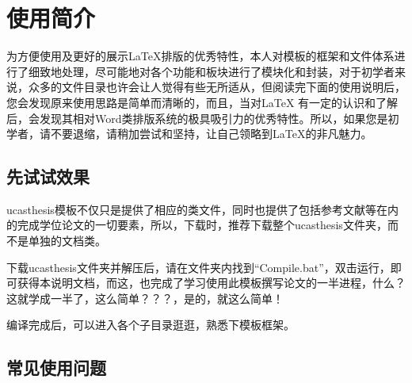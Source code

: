 
\chapter{使用简介}
\label{chap:guide}

为方便使用及更好的展示\LaTeX{}排版的优秀特性，本人对模板的框架和文件体系进行了细致地处理，尽可能地对各个功能和板块进行了模块化和封装，对于初学者来说，众多的文件目录也许会让人觉得有些无所适从，但阅读完下面的使用说明后，您会发现原来使用思路是简单而清晰的，而且，当对\LaTeX{} 有一定的认识和了解后，会发现其相对Word类排版系统的极具吸引力的优秀特性。所以，如果您是初学者，请不要退缩，请稍加尝试和坚持，让自己领略到\LaTeX{}的非凡魅力。

\section{先试试效果}

ucasthesis模板不仅只是提供了相应的类文件，同时也提供了包括参考文献等在内的完成学位论文的一切要素，所以，下载时，推荐下载整个ucasthesis文件夹，而不是单独的文档类。

下载ucasthesis文件夹并解压后，请在文件夹内找到“Compile.bat”，双击运行，即可获得本说明文档，而这，也完成了学习使用此模板撰写论文的一半进程，什么？这就学成一半了，这么简单？？？，是的，就这么简单！

编译完成后，可以进入各个子目录逛逛，熟悉下模板框架。

\section{常见使用问题}

